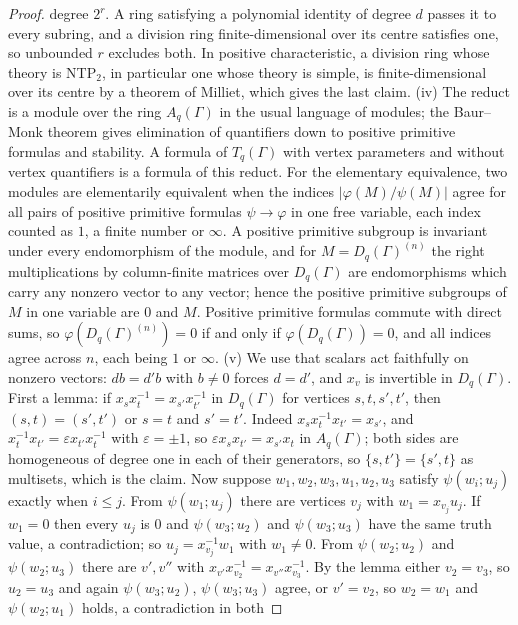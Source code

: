 \documentclass[11pt]{article}
\theoremstyle{definition}
\newcommand{\eps}{\varepsilon}
\begin{document}
\begin{proof}
degree $2^r$.  A ring satisfying a polynomial
identity of degree $d$ passes it to every subring, and a division ring
finite-dimensional over its centre satisfies one, so unbounded $r$ excludes
both.  In positive characteristic, a division
ring whose theory is NTP$_2$, in particular one whose theory is simple, is
finite-dimensional over its centre by a theorem of Milliet,
which gives the last claim.
{\rm(iv)} The reduct is a module over the ring $A_q(\Gamma)$ in the usual
language of modules; the Baur--Monk theorem gives elimination of quantifiers
down to positive primitive formulas and stability.  A
formula of $T_q(\Gamma)$ with vertex parameters and without vertex
quantifiers is a formula of this reduct.  For the elementary equivalence,
two modules are elementarily equivalent when the indices $|\varphi(M)/\psi(M)|$ agree
for all pairs of positive primitive formulas $\psi\to\varphi$ in one free variable,
each index counted as $1$, a finite number or $\infty$.  A
positive primitive subgroup is invariant under every endomorphism of the
module, and for $M=D_q(\Gamma)^{(n)}$ the right multiplications by
column-finite matrices over $D_q(\Gamma)$ are endomorphisms which carry any
nonzero vector to any vector; hence the positive primitive subgroups of $M$
in one variable are $0$ and $M$.  Positive primitive formulas commute with
direct sums, so $\varphi(D_q(\Gamma)^{(n)})=0$ if and only if
$\varphi(D_q(\Gamma))=0$, and all indices agree across $n$, each being $1$
or $\infty$.
{\rm(v)} We use that scalars act faithfully on nonzero vectors: $db=d'b$
with $b\ne0$ forces $d=d'$, and $x_v$ is invertible in $D_q(\Gamma)$.  First a
lemma: if $x_sx_t^{-1}=x_{s'}x_{t'}^{-1}$ in $D_q(\Gamma)$ for vertices
$s,t,s',t'$, then $(s,t)=(s',t')$ or $s=t$ and $s'=t'$.  Indeed
$x_sx_t^{-1}x_{t'}=x_{s'}$, and $x_t^{-1}x_{t'}=\eps x_{t'}x_t^{-1}$ with
$\eps=\pm1$, so $\eps x_sx_{t'}=x_{s'}x_t$ in $A_q(\Gamma)$; both sides are
homogeneous of degree one in each of their generators, so
$\{s,t'\}=\{s',t\}$ as multisets, which is the claim.  Now suppose
$w_1,w_2,w_3,u_1,u_2,u_3$ satisfy $\psi(w_i;u_j)$ exactly when $i\le j$.
From $\psi(w_1;u_j)$ there are vertices $v_j$ with $w_1=x_{v_j}u_j$.  If
$w_1=0$ then every $u_j$ is $0$ and $\psi(w_3;u_2)$ and $\psi(w_3;u_3)$
have the same truth value, a contradiction; so $u_j=x_{v_j}^{-1}w_1$ with
$w_1\ne0$.  From $\psi(w_2;u_2)$ and $\psi(w_2;u_3)$ there are $v',v''$ with
$x_{v'}x_{v_2}^{-1}=x_{v''}x_{v_3}^{-1}$.  By the lemma either
$v_2=v_3$, so $u_2=u_3$ and again $\psi(w_3;u_2)$, $\psi(w_3;u_3)$ agree, or
$v'=v_2$, so $w_2=w_1$ and $\psi(w_2;u_1)$ holds, a contradiction in both

\end{proof}
\end{document}
